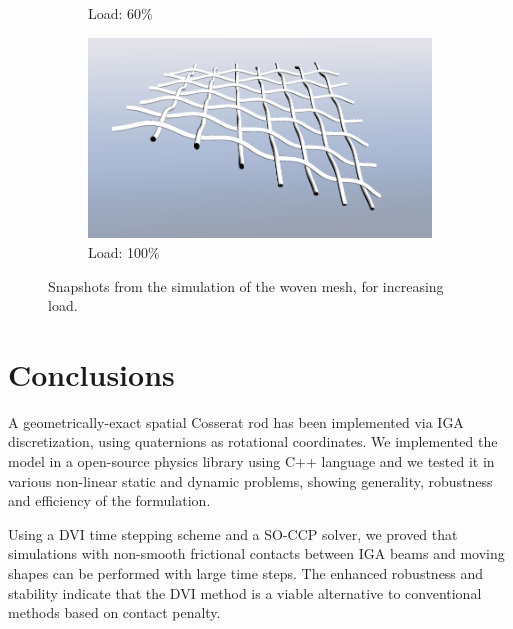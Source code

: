\documentclass[review]{elsarticle}
\begin{document}
\begin{figure}[ht]
\begin{subfigure}[b]{0.475\textwidth}
        \caption{{\small Load: 60\%}}
    \end{subfigure}
    \quad
    \begin{subfigure}[b]{0.475\textwidth}   
        \centering 
        \includegraphics[width=\textwidth]{benchmark_mesh/mesh_load100.png}
        \caption{{\small Load: 100\%}}
    \end{subfigure}
    \caption[Woven mesh]
    {\small Snapshots from the simulation of the woven mesh, for increasing load.} 
    \label{fig:woven_mesh}
\end{figure}


\section{Conclusions}

A geometrically-exact spatial Cosserat rod has been implemented via IGA discretization, using quaternions as rotational coordinates. We implemented the model in a open-source physics library using C++ language and we tested it in various non-linear static and dynamic problems, showing generality, robustness and efficiency of the formulation. 

Using a DVI time stepping scheme and a SO-CCP solver, we proved that simulations with non-smooth frictional contacts between IGA beams and moving shapes can be performed with large time steps. The enhanced robustness and stability indicate that the DVI method is a viable alternative to conventional methods based on contact penalty. 


%
%
\section*{\refname}


\end{document}

